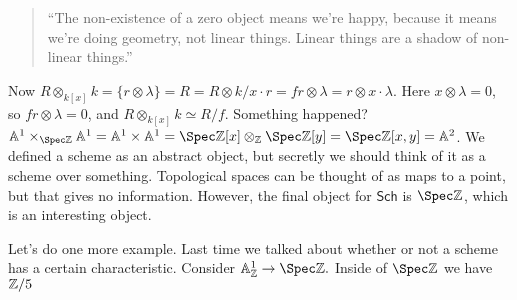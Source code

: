 \begin{quotation}
    ``The non-existence of a zero object means we're happy, because  it means we're doing geometry, not linear things. Linear things are a shadow of non-linear things.'' 
\end{quotation}
Now $R\otimes _{k[x]}k = \{r \otimes \lambda\} =R=R\otimes k/ x \cdot r=fr \otimes \lambda =r\otimes x \cdot \lambda$. Here $x \otimes \lambda=0$, so $fr\otimes \lambda=0$, and $R \otimes _{k[x]} k \simeq  R /f$. Something happened? $\A^1 \times _{\Spec \Z}\A^1 = \A^1 \times \A^1 = \Spec \Z[x] \otimes _{\Z}\Spec \Z[y]=\Spec \Z[x,y]=\A^2$. We defined a scheme as an abstract object, but secretly we should think of it as a scheme over something. Topological spaces can be thought of as maps to a point, but that gives no information. However, the final object for $\mathsf{Sch} $ is $\Spec \Z$, which is an interesting object.

Let's do one more example. Last time we talked about whether or not a scheme has a certain characteristic. Consider $\A^1 _{\Z}\to  \Spec \Z.$ Inside of $\Spec \Z$ we have $\mathbb{Z} /5$
